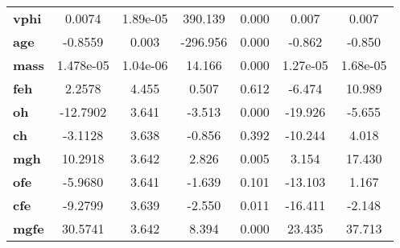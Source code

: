 \begin{center}
\begin{tabular}{lcccccc}
\textbf{vphi}      &       0.0074  &     1.89e-05     &   390.139  &         0.000        &        0.007    &        0.007     \\
\textbf{age}       &      -0.8559  &        0.003     &  -296.956  &         0.000        &       -0.862    &       -0.850     \\
\textbf{mass}      &    1.478e-05  &     1.04e-06     &    14.166  &         0.000        &     1.27e-05    &     1.68e-05     \\
\textbf{feh}       &       2.2578  &        4.455     &     0.507  &         0.612        &       -6.474    &       10.989     \\
\textbf{oh}        &     -12.7902  &        3.641     &    -3.513  &         0.000        &      -19.926    &       -5.655     \\
\textbf{ch}        &      -3.1128  &        3.638     &    -0.856  &         0.392        &      -10.244    &        4.018     \\
\textbf{mgh}       &      10.2918  &        3.642     &     2.826  &         0.005        &        3.154    &       17.430     \\
\textbf{ofe}       &      -5.9680  &        3.641     &    -1.639  &         0.101        &      -13.103    &        1.167     \\
\textbf{cfe}       &      -9.2799  &        3.639     &    -2.550  &         0.011        &      -16.411    &       -2.148     \\
\textbf{mgfe}      &      30.5741  &        3.642     &     8.394  &         0.000        &       23.435    &       37.713     \\
\bottomrule
\end{tabular}
\end{center}